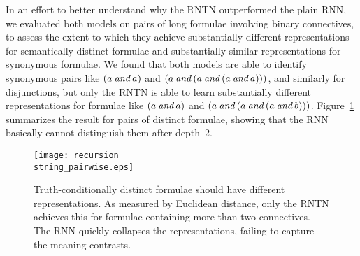 In an effort to better understand why the RNTN outperformed the plain
RNN, we evaluated both models on pairs of long formulae involving
binary connectives, to assess the extent to which they achieve
substantially different representations for semantically distinct
formulae and substantially similar representations for synonymous
formulae. We found that both models are able to identify synonymous
pairs like $(a \mathbin{\textit{and}} a)$ and $(a \mathbin{\textit{and}} (a \mathbin{\textit{and}} (a \mathbin{\textit{and}} a)))$,
and similarly for disjunctions, but only the RNTN is able to learn
substantially different representations for formulae like $(a \mathbin{\textit{and}}
a)$ and $(a \mathbin{\textit{and}} (a \mathbin{\textit{and}} (a \mathbin{\textit{and}}
b)))$. Figure~\ref{prop-falloff} summarizes the result for pairs of
distinct formulae, showing that the RNN basically cannot distinguish
them after depth~2.



\begin{figure}[htp]
  \centering
  \texttt{[image: recursion\\string\_pairwise.eps]}
  \caption{Truth-conditionally distinct formulae should have different
    representations. As measured by Euclidean distance, only the RNTN
    achieves this for formulae containing more than two
    connectives. The RNN quickly collapses the representations,
    failing to capture the meaning contrasts.}
  \label{prop-falloff}
\end{figure}


